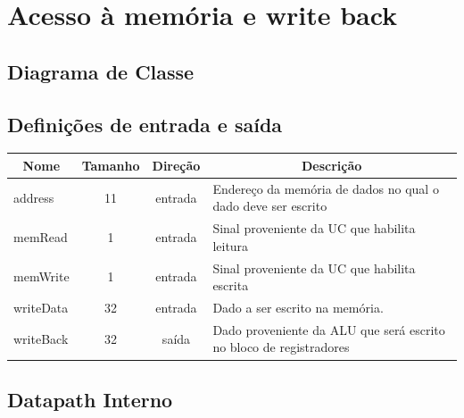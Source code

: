 \section{Acesso à memória e write back}
	\subsection{Diagrama de Classe}
  \begin{figure}[H]
    
  \end{figure}

\subsection{Definições de entrada e saída}

	\begin{center}
        \begin{longtable}[pos]{| l | c | c | m{7cm} |} \hline
          \multicolumn{1}{|c|}{\cellcolor[gray]{0.9}\textbf{Nome}} & 
          \multicolumn{1}{c|}{\cellcolor[gray]{0.9}\textbf{Tamanho}} & 
          \multicolumn{1}{c|}{\cellcolor[gray]{0.9}\textbf{Direção}} &
          \multicolumn{1}{c|}{\cellcolor[gray]{0.9}\textbf{Descrição}} \\ \hline
          \endhead
          \hline
          \endlastfoot

          address                  & 11  & entrada   & Endereço da memória de dados no qual o dado deve ser escrito   \\ \hline
          memRead                  & 1   & entrada   & Sinal proveniente da UC que habilita leitura    \\ \hline
          memWrite                 & 1   & entrada   & Sinal proveniente da UC que habilita escrita    \\ \hline
          writeData      		   & 32   & entrada   & Dado a ser escrito na memória. \\ \hline
          writeBack	               & 32  & saída     & Dado proveniente da ALU que será escrito no bloco de registradores\\ \hline
        \end{longtable}
      \end{center}
    
    \newpage  
\subsection{Datapath Interno}
	
